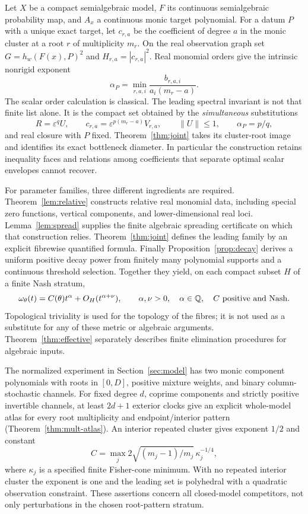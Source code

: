 Let $X$ be a compact semialgebraic model, $F$ its continuous semialgebraic
probability map, and $A_x$ a continuous monic target polynomial. For a
datum $P$ with a unique exact target, let $c_{r,a}$ be the coefficient
of degree $a$ in the monic cluster at a root $r$ of multiplicity $m_r$.
On the real observation graph set $G=h_w(F(x),P)^2$ and
$H_{r,a}=|c_{r,a}|^2$. Real monomial orders give the intrinsic nonrigid
exponent
\[
 \alpha_P=\min_{r,a,i}\frac{b_{r,a,i}}{a_i(m_r-a)}.
\]
The scalar order calculation is classical. The leading spectral invariant
is not that finite list alone. It is the compact set obtained by the
\emph{simultaneous} substitutions
\[
 R=\varepsilon^q U,\qquad c_{r,a}=\varepsilon^{p(m_r-a)}V_{r,a},
 \qquad \|U\|\le1,\qquad \alpha_P=p/q,
\]
and real closure with $P$ fixed. Theorem~\ref{thm:joint} takes its
cluster-root image and identifies its exact bottleneck diameter. In
particular the construction retains inequality faces and relations among
coefficients that separate optimal scalar envelopes cannot recover.

For parameter families, three different ingredients are required.
Theorem~\ref{lem:relative} constructs relative real monomial data, including
special zero functions, vertical components, and lower-dimensional real
loci. Lemma~\ref{lem:spread} supplies the finite algebraic spreading
certificate on which that construction relies. Theorem~\ref{thm:joint}
defines the leading family by an explicit fibrewise quantified formula.
Finally Proposition~\ref{prop:decay} derives a uniform positive decay
power from finitely many polynomial supports and a continuous threshold
selection. Together they yield, on each compact subset $H$ of a finite
Nash stratum,
\[
 \omega_\theta(t)=C(\theta)t^\alpha+O_H(t^{\alpha+\nu}),\qquad
 \alpha,\nu>0,\quad \alpha\in\mathbb Q,\quad C\text{ positive and Nash}.
\]
Topological triviality is used for the topology of the fibres; it is not
used as a substitute for any of these metric or algebraic arguments.
Theorem~\ref{thm:effective} separately describes finite elimination
procedures for algebraic inputs.

The normalized experiment in Section~\ref{sec:model} has two monic
component polynomials with roots in $[0,D]$, positive mixture weights,
and binary column-stochastic channels. For fixed degree $d$, coprime
components and strictly positive invertible channels, at least $2d+1$
exterior clocks give an explicit whole-model atlas for every root
multiplicity and endpoint/interior pattern
(Theorem~\ref{thm:mult-atlas}). An interior repeated cluster gives exponent
$1/2$ and constant
\[
 C=\max_j 2\sqrt{(m_j-1)/m_j}\,\kappa_j^{-1/4},
\]
where $\kappa_j$ is a specified finite Fisher-cone minimum. With no
repeated interior cluster the exponent is one and the leading set is
polyhedral with a quadratic observation constraint. These assertions
concern all closed-model competitors, not only perturbations in the
chosen root-pattern stratum.

